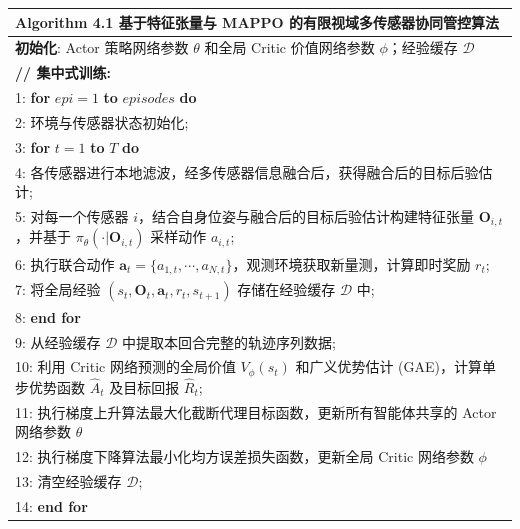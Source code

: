 \begin{table}[htbp]
  \centering
  \label{alg:mappo_coop}
  \renewcommand{\arraystretch}{1.2} %
  \begin{tabular}{p{}}
    \toprule
    \textbf{Algorithm 4.1} 基于特征张量与 MAPPO 的有限视域多传感器协同管控算法 \\
    \midrule
    \textbf{初始化}: Actor 策略网络参数 $\theta$ 和全局 Critic 价值网络参数 $\phi$；经验缓存 $\mathcal{D}$ \\
    
    \textbf{// 集中式训练:} \\
    1: \textbf{for} $epi = 1$ \textbf{to} $episodes$ \textbf{do} \\
    2: \quad 环境与传感器状态初始化; \\

    3: \quad \textbf{for} $t = 1$ \textbf{to} $T$ \textbf{do} \\
    4: \quad \quad 各传感器进行本地滤波，经多传感器信息融合后，获得融合后的目标后验估计; \\
    5: \quad \quad 对每一个传感器 $i$，结合自身位姿与融合后的目标后验估计构建特征张量 $\mathbf{O}_{i,t}$，并基于 $\pi_{\theta}(\cdot|\mathbf{O}_{i,t})$ 采样动作 $a_{i,t}$; \\
    6: \quad \quad 执行联合动作 $\mathbf{a}_t = \{a_{1,t}, \cdots, a_{N,t}\}$，观测环境获取新量测，计算即时奖励 $r_t$; \\
    7: \quad \quad 将全局经验 $(s_t, \mathbf{O}_t, \mathbf{a}_t, r_t, s_{t+1})$ 存储在经验缓存 $\mathcal{D}$ 中; \\
    8: \quad \textbf{end for} \\
    
    9: \quad 从经验缓存 $\mathcal{D}$ 中提取本回合完整的轨迹序列数据; \\
    10: \quad 利用 Critic 网络预测的全局价值 $V_\phi(s_t)$ 和广义优势估计 (GAE)，计算单步优势函数 $\hat{A}_t$ 及目标回报 $\hat{R}_t$; \\
    11: \quad 执行梯度上升算法最大化截断代理目标函数，更新所有智能体共享的 Actor 网络参数 $\theta$ \\
    12: \quad 执行梯度下降算法最小化均方误差损失函数，更新全局 Critic 网络参数 $\phi$ \\
   
    13: \quad 清空经验缓存 $\mathcal{D}$; \\
    14: \textbf{end for} \\
    

\end{tabular}
\end{table}

